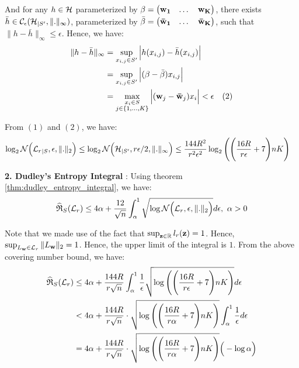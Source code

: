 \noindent And for any $h\in \mathcal{H}$ parameterized by $\beta=\begin{pmatrix} {\bf w_1} &\dots &{\bf w_K}\end{pmatrix}$, there exists $\bar h \in \mathcal{C}_\epsilon(\mathcal{H}_{|S'}, \|.\|_\infty)$, parameterized by $\bar\beta=\begin{pmatrix} {\bf \bar w_1} &\dots &{\bf \bar w_K}\end{pmatrix}$, such that $\|h - \bar h\|_\infty \le \epsilon$. Hence, we have:
\begin{align*}
    \|h - \bar h\|_\infty &= \sup_{x_{i, j} \in S'} \bigAbs{h(x_{i,j}) - \bar h(x_{i,j})} \\
        &= \sup_{x_{i,j}\in S'}\bigAbs{(\beta - \bar\beta)x_{i,j}} \\
        &= \max_{\substack{x_i\in S \\ j\in\{1, \dots, K\}}}\bigAbs{(\vecbf{w}_j - \vecbf{\bar w}_j)x_i} < \epsilon \ \ \ (2)
\end{align*}

\noindent From $(1)$ and $(2)$, we have:
\begin{align*}
    \log_2\mathcal{N}\Big( {\mathcal{L}_r}_{|S}, \epsilon, \|.\|_2 \Big) 
    &\le \log_2\mathcal{N}\Big( \mathcal{H}_{|S'}, r\epsilon/2, \|.\|_\infty \Big)
    \le \frac{144R^2}{r^2\epsilon^2}\log_2\Bigg( 
        \Bigg( 
            \frac{16R}{r\epsilon} + 7
         \Bigg)nK
     \Bigg)
\end{align*}

\noindent\newline\textbf{2. Dudley's Entropy Integral} : Using theorem \ref{thm:dudley_entropy_integral}, we have:
\begin{align*}
    \widehat{\mathfrak{R}}_S(\mathcal{L}_r) \le 4\alpha + \frac{12}{\sqrt n}\int_{\alpha}^1 \sqrt{\log\mathcal{N}\Big( \mathcal{L}_r, \epsilon, \|.\|_2 \Big)}d\epsilon, \ \alpha > 0 
\end{align*}

\noindent Note that we made use of the fact that $\sup_{{\bf z} \in \mathbb{R}} l_r({\bf z}) = 1$. Hence, $\sup_{L_{\bf w}\in\mathcal{L}_r} \|L_{\bf w}\|_2 = 1$. Hence, the upper limit of the integral is $1$. From the above covering number bound, we have:
\begin{align*}
    \widehat{\mathfrak{R}}_S(\mathcal{L}_r) 
        &\le 4\alpha + \frac{144R}{r\sqrt n}\int_{\alpha}^1 \frac{1}{\epsilon}\sqrt{\log\Bigg( 
            \Bigg( \frac{16R}{r\epsilon}+7
         \Bigg)nK \Bigg)}d\epsilon \\
        &< 4\alpha + \frac{144R}{r\sqrt n} \cdot  \sqrt{
            \log\Bigg( \Bigg( 
                \frac{16R}{r\alpha} + 7
             \Bigg)nK \Bigg)
        }\int_\alpha^1 \frac{1}{\epsilon}d\epsilon \\
        &= 4\alpha + \frac{144R}{r\sqrt n} \cdot  \sqrt{
            \log\Bigg( \Bigg( 
                \frac{16R}{r\alpha} + 7
             \Bigg)nK \Bigg)
        }\Big( -\log\alpha \Big)
\end{align*}

